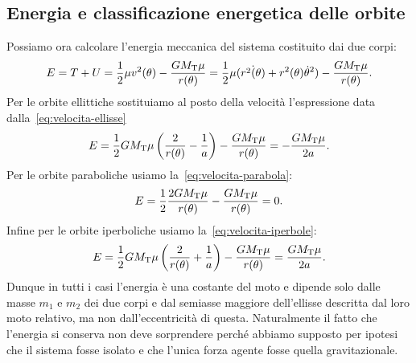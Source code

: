 \subsection{Energia e classificazione energetica delle orbite}
\label{sec:energia-orbite}

Possiamo ora calcolare l'energia meccanica del sistema costituito dai due corpi:
\begin{equation}
  \label{eq:energia}
  E= T + U = \frac{1}{2}\mu v^2(\theta) - \frac{GM_\textup{T}\mu}{r(\theta)}
  = \frac{1}{2}\mu(\dot{r^2(\theta)} + r^2(\theta)\dot{\theta}^2) -
  \frac{GM_\textup{T}\mu}{r(\theta)}.
\end{equation}
Per le orbite ellittiche sostituiamo al posto della velocità l'espressione data
dalla~\eqref{eq:velocita-ellisse}
\begin{equation}
  \label{eq:energia-ellisse}
  E = \frac{1}{2}GM_\textup{T}\mu
  \left(
    \frac{2}{r(\theta)} - \frac{1}{a}
  \right) - \frac{GM_\textup{T}\mu}{r(\theta)} = -\frac{GM_\textup{T}\mu}{2a}.
\end{equation}
Per le orbite paraboliche usiamo la~\eqref{eq:velocita-parabola}:
\begin{equation}
  E = \frac{1}{2}\frac{2GM_\textup{T}\mu}{r(\theta)} -
  \frac{GM_\textup{T}\mu}{r(\theta)} = 0.
\end{equation}
Infine per le orbite iperboliche usiamo la~\eqref{eq:velocita-iperbole}:
\begin{equation}
    \label{eq:energia-iperbole}
  E = \frac{1}{2}GM_\textup{T}\mu
  \left(
    \frac{2}{r(\theta)} + \frac{1}{a}
  \right) - \frac{GM_\textup{T}\mu}{r(\theta)} = \frac{GM_\textup{T}\mu}{2a}.
\end{equation}
Dunque in tutti i casi l'energia è una costante del moto e dipende solo dalle
masse $m_1$ e $m_2$ dei due corpi e dal semiasse maggiore dell'ellisse descritta
dal loro moto relativo, ma non dall'eccentricità di questa. Naturalmente il
fatto che l'energia si conserva non deve sorprendere perché abbiamo supposto per
ipotesi che il sistema fosse isolato e che l'unica forza agente fosse quella
gravitazionale. %

